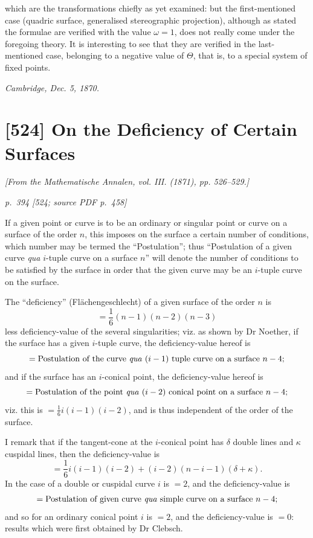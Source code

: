 \documentclass[11pt,a4paper]{article}
\newcommand{\pagemarker}[3]{\par\bigskip\noindent\textit{p.~#1 [#2; source PDF p.~#3]}\par\smallskip}
\begin{document}
which are the transformations chiefly as yet examined: but the first-mentioned case
(quadric surface, generalised stereographic projection), although as stated the
formulae are verified with the value $\omega=1$, does not really come under the
foregoing theory. It is interesting to see that they are verified in the last-mentioned
case, belonging to a negative value of $\Theta$, that is, to a special system of fixed
points.

\noindent\textit{Cambridge, Dec. 5, 1870.}

\clearpage
\section*{[524] On the Deficiency of Certain Surfaces}
\begin{center}
\textit{[From the Mathematische Annalen, vol. III. (1871), pp. 526--529.]}
\end{center}

\pagemarker{394}{524}{458}

If a given point or curve is to be an ordinary or singular point or curve on a surface
of the order $n$, this imposes on the surface a certain number of conditions, which
number may be termed the ``Postulation''; thus ``Postulation of a given curve
\textit{qua} $i$-tuple curve on a surface $n$'' will denote the number of conditions to be
satisfied by the surface in order that the given curve may be an $i$-tuple curve on
the surface.

The ``deficiency'' (Fl\"achengeschlecht) of a given surface of the order $n$ is
\[
=\frac16(n-1)(n-2)(n-3)
\]
less deficiency-value of the several singularities; viz. as shown by Dr Noether, if the
surface has a given $i$-tuple curve, the deficiency-value hereof is
\[
=\hbox{Postulation of the curve \textit{qua} }(i-1)\hbox{ tuple curve on a surface }n-4;
\]
and if the surface has an $i$-conical point, the deficiency-value hereof is
\[
=\hbox{Postulation of the point \textit{qua} }(i-2)\hbox{ conical point on a surface }n-4;
\]
viz. this is $=\frac16 i(i-1)(i-2)$, and is thus independent of the order of the
surface.

I remark that if the tangent-cone at the $i$-conical point has $\delta$ double lines and
$\kappa$ cuspidal lines, then the deficiency-value is
\[
=\frac16 i(i-1)(i-2)+(i-2)(n-i-1)(\delta+\kappa).
\]
In the case of a double or cuspidal curve $i$ is $=2$, and the deficiency-value is
\[
=\hbox{Postulation of given curve \textit{qua} simple curve on a surface }n-4;
\]
and so for an ordinary conical point $i$ is $=2$, and the deficiency-value is $=0$:
results which were first obtained by Dr Clebsch.
\end{document}
